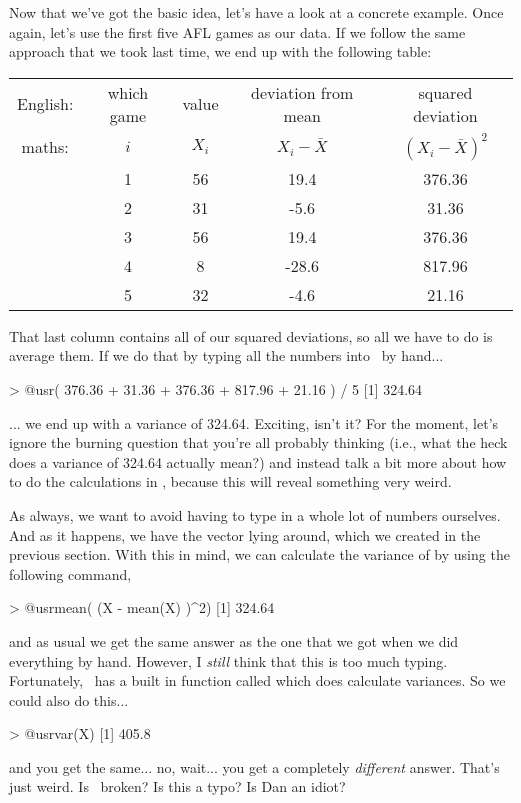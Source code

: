 Now that we've got the basic idea, let's have a look at a concrete example. Once again, let's use the first five AFL games as our data. If we follow the same approach that we took last time, we end up with the following table:
\begin{center}
\begin{tabular}{ccccc} 
English: & which game & value & deviation from mean & squared deviation \\
maths: & $i$ & $X_i$ & $X_i - \bar{X}$ &  $(X_i - \bar{X})^2$ \\ \hline
& 1 & 56 & 19.4  & 376.36\\
& 2 & 31 &  -5.6 & 31.36\\ 
& 3 & 56 & 19.4  & 376.36\\
& 4 & 8 & -28.6  & 817.96\\
& 5 & 32 & -4.6  & 21.16 \\
\end{tabular}
\end{center}
That last column contains all of our squared deviations, so all we have to do is average them. If we do that by typing all the numbers into \R\ by hand...
\begin{rblock1}
> @usr{( 376.36 + 31.36 + 376.36 + 817.96 + 21.16 ) / 5}
[1] 324.64
\end{rblock1}
... we end up with a variance of 324.64. Exciting, isn't it? For the moment, let's ignore the burning question that you're all probably thinking (i.e., what the heck does a variance of 324.64 actually mean?) and instead talk a bit more about how to do the calculations in \R, because this will reveal something very weird.

As always, we want to avoid having to type in a whole lot of numbers ourselves. And as it happens, we have the vector  lying around, which we created in the previous section. With this in mind, we can calculate the variance of  by using the following command,
\begin{rblock1}
> @usr{mean( (X - mean(X) )^2)}
[1] 324.64
\end{rblock1}
and as usual we get the same answer as the one that we got when we did everything by hand. However, I {\it still} think that this is too much typing. Fortunately, \R\ has a built in function called  which does calculate variances. So we could also do this...
\begin{rblock1}
> @usr{var(X)}
[1] 405.8
\end{rblock1}
and you get the same... no, wait... you get a completely {\it different} answer. That's just weird. Is \R\ broken? Is this a typo? Is Dan an idiot? 

